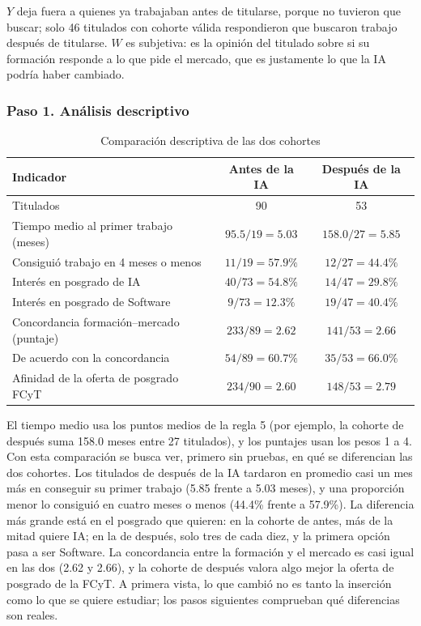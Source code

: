 \documentclass[12pt, a4paper]{article}
\newenvironment{mitabla}[2][H]{%
  \begin{table}[#1]
  \centering
  \caption{#2}
  \small
}{%
  \end{table}
}
\begin{document}
$Y$ deja fuera a quienes ya trabajaban antes de titularse, porque no
tuvieron que buscar; solo 46 titulados con cohorte válida respondieron
que buscaron trabajo después de titularse. $W$ es subjetiva: es la
opinión del titulado sobre si su formación responde a lo que pide el
mercado, que es justamente lo que la IA podría haber cambiado.

\subsubsection{Paso 1. Análisis descriptivo}

\begin{mitabla}{Comparación descriptiva de las dos cohortes}\label{tab:a4-desc}
\begin{tabular}{lcc}
\toprule
\textbf{Indicador} & \textbf{Antes de la IA} & \textbf{Después de la IA} \\
\midrule
Titulados & 90 & 53 \\
Tiempo medio al primer trabajo (meses) & $95.5/19 = 5.03$ & $158.0/27 = 5.85$ \\
Consiguió trabajo en 4 meses o menos & $11/19 = 57.9\%$ & $12/27 = 44.4\%$ \\
Interés en posgrado de IA & $40/73 = 54.8\%$ & $14/47 = 29.8\%$ \\
Interés en posgrado de Software & $9/73 = 12.3\%$ & $19/47 = 40.4\%$ \\
Concordancia formación--mercado (puntaje) & $233/89 = 2.62$ & $141/53 = 2.66$ \\
De acuerdo con la concordancia & $54/89 = 60.7\%$ & $35/53 = 66.0\%$ \\
Afinidad de la oferta de posgrado FCyT & $234/90 = 2.60$ & $148/53 = 2.79$ \\
\bottomrule
\end{tabular}
\end{mitabla}

El tiempo medio usa los puntos medios de la regla 5 (por ejemplo, la
cohorte de después suma 158.0 meses entre 27 titulados), y los puntajes
usan los pesos 1 a 4. Con esta comparación se busca ver, primero sin
pruebas, en qué se diferencian las dos cohortes. Los titulados de después
de la IA tardaron en promedio casi un mes más en conseguir su primer
trabajo (5.85 frente a 5.03 meses), y una proporción menor lo consiguió
en cuatro meses o menos (44.4\% frente a 57.9\%). La diferencia más
grande está en el posgrado que quieren: en la cohorte de antes, más de la
mitad quiere IA; en la de después, solo tres de cada diez, y la primera
opción pasa a ser Software. La concordancia entre la formación y el
mercado es casi igual en las dos (2.62 y 2.66), y la cohorte de después
valora algo mejor la oferta de posgrado de la FCyT. A primera vista, lo
que cambió no es tanto la inserción como lo que se quiere estudiar; los
pasos siguientes comprueban qué diferencias son reales.
\end{document}
